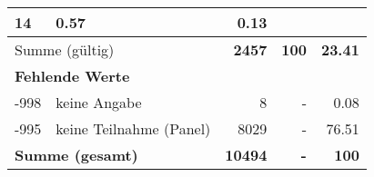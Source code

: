 \begin{longtable}{lXrrr}
       \num{14} &
       \num[round-mode=places,round-precision=2]{0.57} &
         \num[round-mode=places,round-precision=2]{0.13} \\
     \midrule
     \multicolumn{2}{l}{Summe (gültig)} &
       \textbf{\num{2457}} &
     \textbf{\num{100}} &
       \textbf{\num[round-mode=places,round-precision=2]{23.41}} \\
     \multicolumn{5}{l}{\textbf{Fehlende Werte}}\\
       -998 &
       keine Angabe &
         \num{8} &
        - &
         \num[round-mode=places,round-precision=2]{0.08} \\
       -995 &
       keine Teilnahme (Panel) &
         \num{8029} &
        - &
         \num[round-mode=places,round-precision=2]{76.51} \\
     \midrule
     \multicolumn{2}{l}{\textbf{Summe (gesamt)}} &
          \textbf{\num{10494}} &
        \textbf{-} &
        \textbf{\num{100}} \\
     \bottomrule
     \end{longtable}
     
